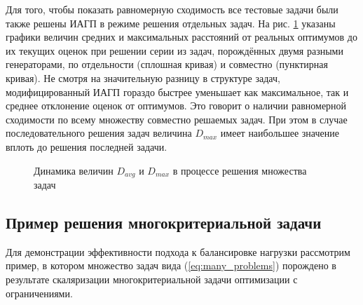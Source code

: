 \documentclass[11pt, oneside, a4paper]{article}
\begin{document}
Для того, чтобы показать равномерную сходимость все тестовые задачи были также решены ИАГП
в режиме решения отдельных задач. На рис. \ref{fig:devs_mixed} указаны графики величин
средних и максимальных расстояний от реальных оптимумов до их текущих оценок при решении
серии из задач, порождённых двумя разными генераторами, по отдельности (сплошная кривая) и совместно (пунктирная кривая).
Не смотря на значительную разницу в структуре задач, модифицированный ИАГП
гораздо быстрее уменьшает как максимальное, так и среднее отклонение оценок от оптимумов.
Это говорит о наличии равномерной сходимости по всему множеству совместно решаемых задач.
При этом в случае последовательного решения задач величина \(D_{max}\) имеет наибольшее значение вплоть
до решения последней задачи.

\begin{figure}[ht]
    \centering
    \caption{Динамика величин \(D_{avg}\) и \(D_{max}\) в процессе решения множества задач}
    \label{fig:devs_mixed}
\end{figure}

\subsection{Пример решения многокритериальной задачи}

Для демонстрации эффективности подхода к балансировке нагрузки рассмотрим пример,
в котором множество задач вида (\ref{eq:many_problems}) порождено в результате скаляризации
многокритериальной задачи оптимизации с ограничениями.
\end{document}
